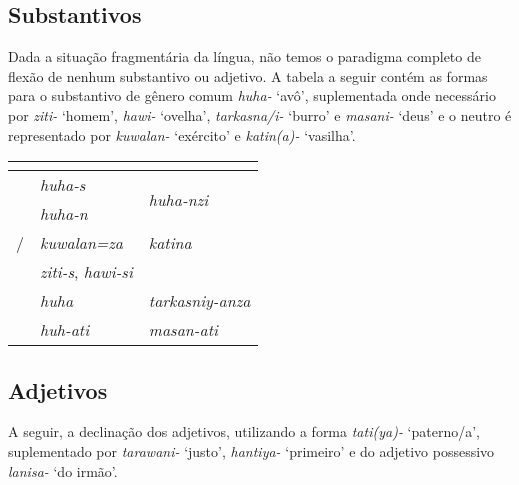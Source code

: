 \subsection{Substantivos}

Dada a situação fragmentária da língua, não temos o paradigma
completo de flexão de nenhum substantivo ou adjetivo. A tabela a seguir contém
as formas para o substantivo de gênero comum \emph{huha-} `avô', suplementada
onde necessário por \emph{ziti-} `homem', \emph{hawi-} `ovelha', \emph{tarkasna\slash{}i-}
`burro' e \emph{masani-} `deus' e o neutro é representado por \emph{kuwalan-}
`exército' e \emph{katin{(a)}-} `vasilha'.


\begin{center}
	\begin{tabular}[c]{lll}
		\toprule
		                      & \Sg{}\emph{}                  & \Pl{}\emph{}                       \\
		\midrule
		\Nom{} \Com{}         & \emph{huha-s}                 & \multirow{2}{4em}{\emph{huha-nzi}} \\
		\Acu{} \Com{}         & \emph{huha-n}                 &                                    \\
		\Nom{}/\Acu{} \Neut{} & \emph{kuwalan=za}             & \emph{katina}                      \\
		\Gen{}                & \emph{ziti-s}, \emph{hawi-si} &                                    \\
		\Dat{}                & \emph{huha}                   & \emph{tarkasniy-anza}              \\
		\Abl{}                & \emph{huh-ati}                & \emph{masan-ati}                   \\
		\bottomrule
	\end{tabular}
\end{center}


\subsection{Adjetivos}
A seguir, a declinação dos adjetivos, utilizando a forma \emph{tati{(ya)}-}
`paterno\slash{}a', suplementado por \emph{tarawani-} `justo',
\emph{hanti{ya}-} `primeiro' e do adjetivo possessivo \emph{lanisa-} `do irmão'.

